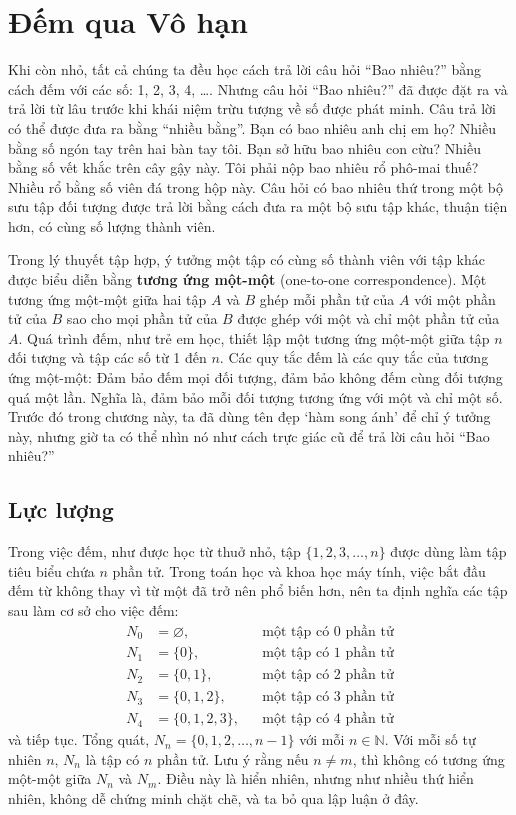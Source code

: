 \section{Đếm qua Vô hạn}

Khi còn nhỏ, tất cả chúng ta đều học cách trả lời câu hỏi ``Bao nhiêu?'' bằng cách đếm với các số: 1, 2, 3, 4, \ldots. Nhưng câu hỏi ``Bao nhiêu?'' đã được đặt ra và trả lời từ lâu trước khi khái niệm trừu tượng về số được phát minh. Câu trả lời có thể được đưa ra bằng ``nhiều bằng''. Bạn có bao nhiêu anh chị em họ? Nhiều bằng số ngón tay trên hai bàn tay tôi. Bạn sở hữu bao nhiêu con cừu? Nhiều bằng số vết khắc trên cây gậy này. Tôi phải nộp bao nhiêu rổ phô-mai thuế? Nhiều rổ bằng số viên đá trong hộp này. Câu hỏi có bao nhiêu thứ trong một bộ sưu tập đối tượng được trả lời bằng cách đưa ra một bộ sưu tập khác, thuận tiện hơn, có cùng số lượng thành viên.

Trong lý thuyết tập hợp, ý tưởng một tập có cùng số thành viên với tập khác được biểu diễn bằng \textbf{tương ứng một-một} (one-to-one correspondence). Một tương ứng một-một giữa hai tập $A$ và $B$ ghép mỗi phần tử của $A$ với một phần tử của $B$ sao cho mọi phần tử của $B$ được ghép với một và chỉ một phần tử của $A$. Quá trình đếm, như trẻ em học, thiết lập một tương ứng một-một giữa tập $n$ đối tượng và tập các số từ 1 đến $n$. Các quy tắc đếm là các quy tắc của tương ứng một-một: Đảm bảo đếm mọi đối tượng, đảm bảo không đếm cùng đối tượng quá một lần. Nghĩa là, đảm bảo mỗi đối tượng tương ứng với một và chỉ một số. Trước đó trong chương này, ta đã dùng tên đẹp `hàm song ánh' để chỉ ý tưởng này, nhưng giờ ta có thể nhìn nó như cách trực giác cũ để trả lời câu hỏi ``Bao nhiêu?''

\subsection{Lực lượng}

Trong việc đếm, như được học từ thuở nhỏ, tập $\{1,2,3,\ldots,n\}$ được dùng làm tập tiêu biểu chứa $n$ phần tử. Trong toán học và khoa học máy tính, việc bắt đầu đếm từ không thay vì từ một đã trở nên phổ biến hơn, nên ta định nghĩa các tập sau làm cơ sở cho việc đếm:
\begin{align*}
N_0 &= \varnothing, & &\text{một tập có 0 phần tử} \\
N_1 &= \{0\}, & &\text{một tập có 1 phần tử} \\
N_2 &= \{0,1\}, & &\text{một tập có 2 phần tử} \\
N_3 &= \{0,1,2\}, & &\text{một tập có 3 phần tử} \\
N_4 &= \{0,1,2,3\}, & &\text{một tập có 4 phần tử}
\end{align*}
và tiếp tục. Tổng quát, $N_n = \{0,1,2,\ldots,n-1\}$ với mỗi $n \in \mathbb{N}$. Với mỗi số tự nhiên $n$, $N_n$ là tập có $n$ phần tử. Lưu ý rằng nếu $n \neq m$, thì không có tương ứng một-một giữa $N_n$ và $N_m$. Điều này là hiển nhiên, nhưng như nhiều thứ hiển nhiên, không dễ chứng minh chặt chẽ, và ta bỏ qua lập luận ở đây.

